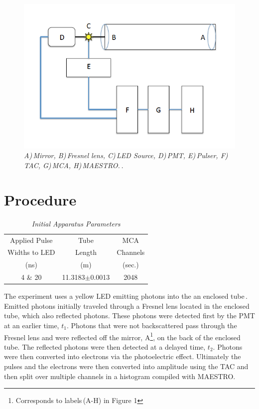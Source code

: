 \documentclass[aps,prl,twocolumn,superscriptaddress,nofootinbib]{revtex4-1}
\begin{document}
\begin{figure}[h!]
  \begin{center}
\centerline{\includegraphics[width=3.in]{solapp.png}}
\caption{\it \small{A)\,Mirror, B)\,Fresnel lens, C)\,LED Source, D)\,PMT, E)\,Pulser, F)\,TAC, G)\,MCA, H)\,MAESTRO.\,\cite{3}. \label{fig1}}}
  \end{center}
\end{figure}

\section{Procedure}


\begin{table}[htb!] 
\caption{\it Initial Apparatus Parameters}
\label{t1}   %
 \begin{center}   %
    \begin{tabular}{|c|c|c|} \hline   %

Applied Pulse & Tube & MCA \\
Widths to LED & Length & Channels  \\
(ns)  & (m) & (sec.)   \\ \hline \hline
4 \& 20 & 11.3183$\pm$0.0013 & 2048 \\ \hline

     \end{tabular}
  \end{center}
\end{table}


The experiment uses a yellow LED emitting photons into the an enclosed tube\,\cite{3}. Emitted photons initially traveled through a Fresnel lens located in the enclosed tube, which also reflected photons. These photons were detected first by the PMT at an earlier time, $t_1$. Photons that were not backscattered pass through the Fresnel lens and were reflected off the mirror, A\footnote[1]{Corresponds to labels\,(A-H) in Figure 1}, on the back of the enclosed tube. The reflected photons were then detected at a delayed time, $t_2$. Photons were then converted into electrons via the photoelectric effect. Ultimately the pulses and the electrons were then converted into amplitude using the TAC and then split over multiple channels in a histogram compiled with MAESTRO.
\end{document}
